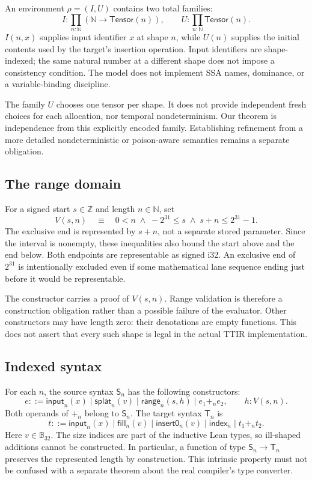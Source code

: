 \documentclass[a4paper,USenglish,anonymous]{lipics-v2021}
\newcommand{\BV}{\mathbb{B}_{32}}
\newcommand{\Ten}{\mathsf{Tensor}}
\newcommand{\Src}{\mathsf{S}}
\newcommand{\Tgt}{\mathsf{T}}
\newcommand{\op}[1]{\ensuremath{\mathsf{#1}}}
\newcommand{\code}[1]{\texttt{\detokenize{#1}}}
\begin{document}
An environment $\rho=(I,U)$ contains two total families:
\[
 I : \prod_{n:\mathbb N}(\mathbb N\to\Ten(n)),
 \qquad U : \prod_{n:\mathbb N}\Ten(n).
\]
$I(n,x)$ supplies input identifier $x$ at shape $n$, while $U(n)$ supplies
the initial contents used by the target's insertion operation. Input
identifiers are shape-indexed; the same natural number at a different shape
does not impose a consistency condition. The model does not implement SSA
names, dominance, or a variable-binding discipline.

The family $U$ chooses one tensor per shape. It does not provide independent
fresh choices for each allocation, nor temporal nondeterminism. Our theorem
is independence from this explicitly encoded family. Establishing refinement
from a more detailed nondeterministic or poison-aware semantics remains a
separate obligation.

\subsection{The range domain}
For a signed start $s\in\mathbb Z$ and length $n\in\mathbb N$, set
\begin{equation}\label{eq:valid}
 V(s,n)\quad\equiv\quad
 0<n\;\land\;-2^{31}\leq s\;\land\;s+n\leq 2^{31}-1.
\end{equation}
The exclusive end is represented by $s+n$, not a separate stored parameter.
Since the interval is nonempty, these inequalities also bound the start
above and the end below. Both endpoints are representable as signed i32.
An exclusive end of $2^{31}$ is intentionally excluded even if some
mathematical lane sequence ending just before it would be representable.

The \code{makeRange} constructor carries a proof of $V(s,n)$. Range
validation is therefore a construction obligation rather than a possible
failure of the evaluator. Other constructors may have length zero: their
denotations are empty functions. This does not assert that every such shape
is legal in the actual TTIR implementation.

\subsection{Indexed syntax}
For each $n$, the source syntax $\Src_n$ has the following constructors:
\[
 e ::= \op{input}_n(x)\mid\op{splat}_n(v)
       \mid\op{range}_n(s,h)\mid e_1+_n e_2,
 \qquad h:V(s,n).
\]
Both operands of $+_n$ belong to $\Src_n$. The target syntax $\Tgt_n$ is
\[
 t ::= \op{input}_n(x)\mid\op{fill}_n(v)
       \mid\op{insert0}_n(v)\mid\op{index}_n\mid t_1+_n t_2.
\]
Here $v\in\BV$. The size indices are part of the inductive Lean types,
so ill-shaped additions cannot be constructed. In particular, a function
of type $\Src_n\to\Tgt_n$ preserves the represented length by construction.
This intrinsic property must not be confused with a separate theorem
about the real compiler's type converter.
\end{document}
